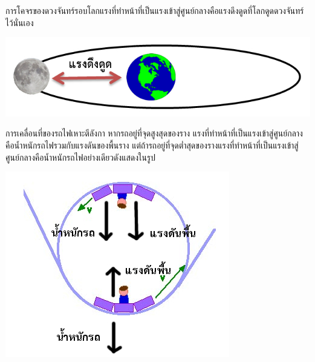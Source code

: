 \begin{center}
\begin{minipage}{.6\textwidth}
การโคจรของดวงจันทร์รอบโลกแรงที่ทำหน้าที่เป็นแรงเข้าสู่ศูนย์กลางคือแรงดึงดูดที่โลกดูดดวงจันทร์ไว้นั่นเอง
\end{minipage} \hfill
\begin{adjustbox}{valign=c} 
    \begin{minipage}[t]{.35\linewidth}
        \includegraphics[width=\linewidth]{content-12-2.jpg}
    \end{minipage}
\end{adjustbox}
\end{center}

\begin{center}
\begin{minipage}{.6\textwidth}
การเคลื่อนที่ของรถไฟเหาะตีลังกา    หากรถอยู่ที่จุดสูงสุดของราง     แรงที่ทำหน้าที่เป็นแรงเข้าสู่ศูนย์กลางคือน้ำหนักรถไฟรวมกับแรงดันของพื้นราง    แต่ถ้ารถอยู่ที่จุดต่ำสุดของรางแรงที่ทำหน้าที่เป็นแรงเข้าสู่ศูนย์กลางคือน้ำหนักรถไฟอย่างเดียวดังแสดงในรูป
\end{minipage} \hfill
\begin{adjustbox}{valign=c} 
    \begin{minipage}[t]{.35\linewidth}
        \includegraphics[width=\linewidth]{content-12-3.jpg}
    \end{minipage}
\end{adjustbox}
\end{center}
